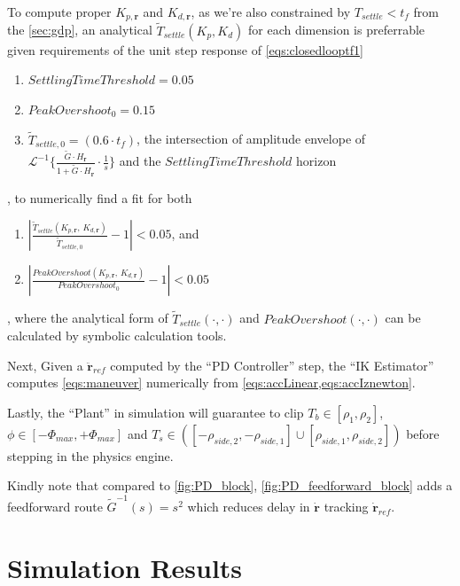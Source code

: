 \documentclass[notitlepage,twocolumn,10pt]{article}
\begin{document}
To compute proper $K_{p, \mathbf{r}}$ and $K_{d, \mathbf{r}}$, as we're also constrained by 
$T_{settle} < t_f$ from the \cref{sec:gdp}, an analytical $\tilde{T}_{settle}(K_p, K_d)$ for each dimension is preferrable given requirements of the unit step response of \cref{eqs:closedlooptf1} 
\begin{enumerate}[label=\textbf{c.\arabic*}, itemsep=2pt]
    \item \label{eqs:setrange} $SettlingTimeThreshold = 0.05$    
    \item \label{eqs:pOS} $PeakOvershoot_0 = 0.15$
    \item \label{eqs:Tsettle} $\tilde{T}_{settle, 0} = (0.6 \cdot t_f)$, the intersection of amplitude envelope of $\mathcal{L}^{-1}\{\frac{\tilde{G} \cdot H_{\mathbf{r}}}{1 + \tilde{G} \cdot H_{\mathbf{r}}} \cdot \frac{1}{s}\}$ and the $SettlingTimeThreshold$ horizon
\end{enumerate}
, to numerically find a fit for both
\begin{enumerate}[label=\textbf{d.\arabic*}, itemsep=2pt]
    \item $|\frac{\tilde{T}_{settle}(K_{p,\mathbf{r}}, \, K_{d,\mathbf{r}})}{\tilde{T}_{settle, 0}} - 1| < 0.05$, and
    \item $|\frac{PeakOvershoot(K_{p,\mathbf{r}}, \, K_{d,\mathbf{r}})}{PeakOvershoot_0} - 1| < 0.05$
\end{enumerate}
, where the analytical form of $\tilde{T}_{settle}(\cdot, \cdot)$ and $PeakOvershoot(\cdot, \cdot)$ can be calculated by symbolic calculation tools. 

Next, Given a $\ddot{\mathbf{r}}_{ref}$ computed by the ``PD Controller'' step, the ``IK Estimator'' computes \cref{eqs:maneuver} numerically from \cref{eqs:accLinear,eqs:accIznewton}.

Lastly, the ``Plant'' in simulation will guarantee to clip $T_{b} \in [\rho_1, \rho_2]$, $\phi \in [-\Phi_{max}, +\Phi_{max}]$ and $T_{s} \in ([-\rho_{side, 2}, -\rho_{side, 1}] \cup [\rho_{side, 1}, \rho_{side, 2}])$ before stepping in the physics engine.

Kindly note that compared to \cref{fig:PD_block}, \cref{fig:PD_feedforward_block} adds a feedforward route $\tilde{G}^{-1}(s) = s^2$ which reduces delay in $\dot{\mathbf{r}}$ tracking $\dot{\mathbf{r}}_{ref}$\cite{visioli2004new}.

\section{Simulation Results}
\end{document}

